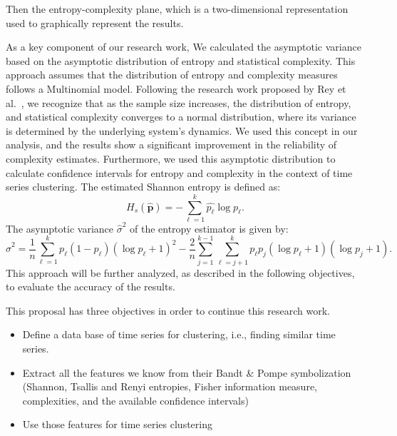 Then the entropy-complexity plane, which is a two-dimensional representation used to graphically represent the results. 

As a key component of our research work, We calculated the asymptotic variance based on the asymptotic distribution of entropy and statistical complexity. This approach assumes that the distribution of entropy and complexity measures follows a Multinomial model. Following the research work proposed by Rey et al.~\cite{Rey2025}, we recognize that as the sample size increases, the distribution of entropy, and statistical complexity converges to a normal distribution, where its variance is determined by the underlying system’s dynamics.  We used this concept in our analysis, and the results show a significant improvement in the reliability of complexity estimates. 
Furthermore, we used this asymptotic distribution to calculate confidence intervals for entropy and complexity in the context of time series clustering. 
The estimated Shannon entropy is defined as:
\begin{equation}
	H_s(\widehat{\bm{p}})=-\sum_{\ell=1}^{k}\widehat{p_\ell}\log\widehat{p_\ell}.
\end{equation}
The asymptotic variance $\widehat{\sigma}^2$ of the entropy estimator is given by:
\begin{equation}
	\widehat{\sigma}^2=\dfrac{1}{n}\sum_{\ell=1}^{k}p_\ell(1-p_\ell)(\log p_\ell+1)^2-\dfrac{2}{n}\sum_{j=1}^{k-1}\sum_{\ell=j+1}^{k}p_\ell p_j(\log p_\ell+1)(\log p_j+1).
\end{equation}
This approach will be further analyzed, as described in the following objectives, to evaluate the accuracy of the results.

This proposal has three objectives in order to continue this research work.
\begin{itemize}
	\item Define a data base of time series for clustering, i.e., finding similar time series. 
	\item Extract all the features we know from their Bandt \& Pompe symbolization (Shannon, Tsallis and Renyi entropies, Fisher information measure, complexities, and the available confidence intervals)
	\item Use those features for time series clustering 
\end{itemize} 

